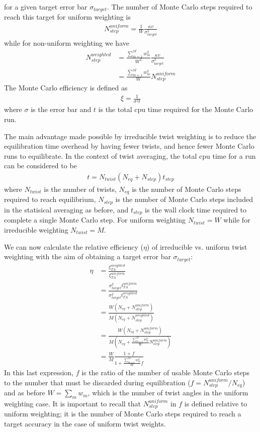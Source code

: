 for a given target error bar $\sigma_{target}$.  The number of Monte Carlo  
steps required to reach this target for uniform weighting is
\begin{align}
  N_{step}^{uniform} = \frac{1}{W}\frac{\kappa v}{\sigma_{target}^2}
\end{align}
while for non-uniform weighting we have
\begin{align}\label{eq:weighted_step}
  N_{step}^{weighted} &= \frac{\sum_{m=1}^Mw_m^2}{W^2}\frac{\kappa v}{\sigma_{target}^2} \nonumber\\
                  &=\frac{\sum_{m=1}^Mw_m^2}{W}N_{step}^{uniform}
\end{align}
The Monte Carlo efficiency is defined as 
\begin{align}
  \xi = \frac{1}{\sigma^2t}
\end{align}
where $\sigma$ is the error bar and $t$ is the total cpu time required 
for the Monte Carlo run.  

The main advantage made possible by irreducible twist weighting is to 
reduce the equilibration time overhead by having fewer twists, and 
hence fewer Monte Carlo runs to equilibrate.  In the context of twist 
averaging, the total cpu time for a run can be considered to be
\begin{align}
  t=N_{twist}(N_{eq}+N_{step})t_{step}
\end{align}
where $N_{twist}$ is the number of twists, $N_{eq}$ is the number of Monte 
Carlo steps required to reach equilibrium, $N_{step}$ is the number 
of Monte Carlo steps included in the statisical averaging as before, 
and $t_{step}$ is the wall clock time required to complete a single 
Monte Carlo step. For uniform weighting $N_{twist}=W$ while for irreducible 
weighting $N_{twist}=M$.

We can now calculate the relative efficiency ($\eta$) of irreducible vs. 
uniform twist weighting with the aim of obtaining a target error bar 
$\sigma_{target}$:
\begin{align}
  \eta &= \frac{\xi_{TA}^{weighted}}{\xi_{TA}^{uniform}} \nonumber \\
       &= \frac{\sigma_{target}^2t_{TA}^{uniform}}{\sigma_{target}^2t_{TA}^{weighted}} \nonumber \\
       &= \frac{W(N_{eq}+N_{step}^{uniform})}{M(N_{eq}+N_{step}^{weighted})} \nonumber \\
       &= \frac{W(N_{eq}+N_{step}^{uniform})}{M(N_{eq}+\frac{\sum_{m=1}^Mw_m^2}{W}N_{step}^{uniform})} \nonumber \\
       &= \frac{W}{M}\frac{1+f}{1+\frac{\sum_{m=1}^Mw_m^2}{W}f}
\end{align}
In this last expression, $f$ is the ratio of the number of usable 
Monte Carlo steps to the number that must be discarded during equilibration 
($f=N_{step}^{uniform}/N_{eq}$) and as before $W=\sum_mw_m$, which is the number of 
twist angles in the uniform weighting case.  It is important to recall 
that $N_{step}^{uniform}$ in $f$ is defined relative to uniform weighting; it is 
the number of Monte Carlo steps required to reach a target accuracy in the 
case of uniform twist weights.

